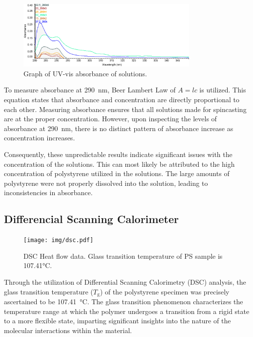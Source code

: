 \documentclass[twocolumn]{article}
\begin{document}
                \begin{figure}
                    \centering
                    \includegraphics[width=0.8\textwidth]{img/uvvis.png}
                    \caption{Graph of UV-vis absorbance of solutions.}\label{fig:uv-vis}
                \end{figure}
                To measure absorbance at \qty{290}{\nano\meter}, Beer Lambert Law of $A = lc$ is utilized. This equation states that absorbance and concentration are directly proportional to each other. Measuring absorbance ensures that all solutions made for spincasting are at the proper concentration. However, upon inspecting the levels of absorbance at \qty{290}{\nano\meter}, there is no distinct pattern of absorbance increase as concentration increases.
                
                Consequently, these unpredictable results indicate significant issues with the concentration of the solutions. This can most likely be attributed to the high concentration of polystyrene utilized in the solutions. The large amounts of  polystyrene were not properly dissolved into the solution, leading to inconsistencies in absorbance.                

            \subsection{Differencial Scanning Calorimeter}
                \begin{figure}[H]
                    \centering
                    \texttt{[image: img/dsc.pdf]}
                    \caption{DSC Heat flow data. Glass transition temperature of PS sample is 107.41°C.}\label{fig:dsc}
                \end{figure}
                Through the utilization of Differential Scanning Calorimetry (DSC) analysis, the glass transition temperature ($T_\text{g}$) of the polystyrene specimen was precisely ascertained to be \qty{107.41}{\degreeCelsius}. The glass transition phenomenon characterizes the temperature range at which the polymer undergoes a transition from a rigid state to a more flexible state, imparting significant insights into the nature of the molecular interactions within the material. 
                
\end{document}
